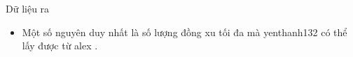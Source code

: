 Dữ liệu ra
\begin{itemize}
	\item     Một số nguyên duy nhất là số lượng đồng xu tối đa mà    yenthanh132    có thể lấy được từ    alex    .   
\end{itemize}